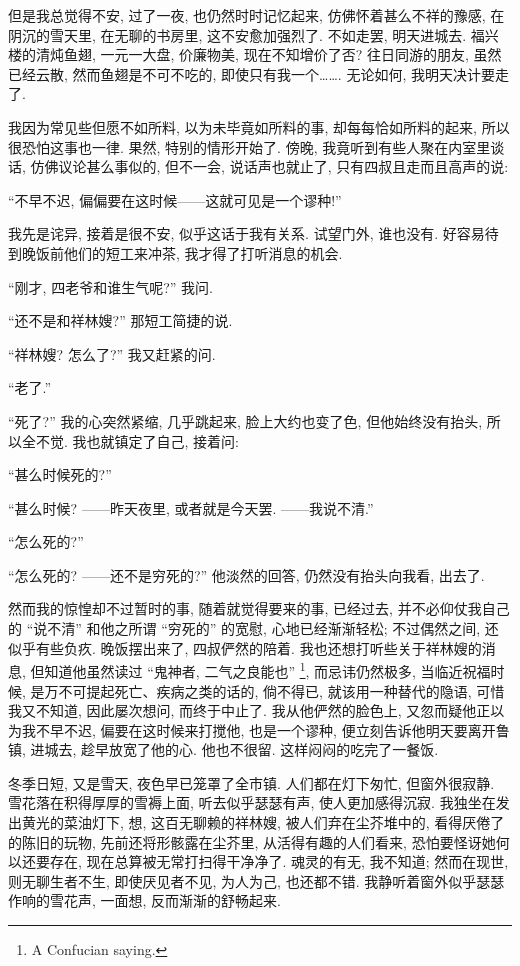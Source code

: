 但是我总觉得不安, 过了一夜, 也仍然时时记忆起来,
仿佛怀着甚么不祥的豫感, 在阴沉的雪天里, 在无聊的书房里,
这不安愈加强烈了.
不如走罢, 明天进城去.
福兴楼的清炖鱼翅, 一元一大盘, 价廉物美, 现在不知增价了否?
往日同游的朋友, 虽然已经云散,
然而鱼翅是不可不吃的, 即使只有我一个…….
无论如何, 我明天决计要走了.

我因为常见些但愿不如所料, 以为未毕竟如所料的事,
却每每恰如所料的起来, 所以很恐怕这事也一律.
果然, 特别的情形开始了.
傍晚, 我竟听到有些人聚在内室里谈话, 仿佛议论甚么事似的, 但不一会, 说话声也就止了, 只有四叔且走而且高声的说:

``不早不迟, 偏偏要在这时候——这就可见是一个谬种!''

我先是诧异, 接着是很不安, 似乎这话于我有关系.
试望门外, 谁也没有.
好容易待到晚饭前他们的短工来冲茶, 我才得了打听消息的机会.

``刚才, 四老爷和谁生气呢?''
我问.

``还不是和祥林嫂?''
那短工简捷的说.

``祥林嫂? 怎么了?''
我又赶紧的问.

``老了.''

``死了?''
我的心突然紧缩, 几乎跳起来, 脸上大约也变了色,
但他始终没有抬头, 所以全不觉.
我也就镇定了自己, 接着问:

``甚么时候死的?''

``甚么时候? ——昨天夜里, 或者就是今天罢.
——我说不清.''

``怎么死的?''

``怎么死的? ——还不是穷死的?''
他淡然的回答, 仍然没有抬头向我看, 出去了.

然而我的惊惶却不过暂时的事, 随着就觉得要来的事, 已经过去,
并不必仰仗我自己的 ``说不清'' 和他之所谓 ``穷死的'' 的宽慰,
心地已经渐渐轻松;
不过偶然之间, 还似乎有些负疚.
晚饭摆出来了, 四叔俨然的陪着.
我也还想打听些关于祥林嫂的消息,
但知道他虽然读过 ``鬼神者, 二气之良能也''%
\footnote{A Confucian saying.},
而忌讳仍然极多, 当临近祝福时候,
是万不可提起死亡、疾病之类的话的,
倘不得已, 就该用一种替代的隐语,
可惜我又不知道, 因此屡次想问, 而终于中止了.
我从他俨然的脸色上, 又忽而疑他正以为我不早不迟,
偏要在这时候来打搅他, 也是一个谬种, 便立刻告诉他明天要离开鲁镇, 进城去, 趁早放宽了他的心.
他也不很留.
这样闷闷的吃完了一餐饭.

冬季日短, 又是雪天, 夜色早已笼罩了全市镇.
人们都在灯下匆忙, 但窗外很寂静.
雪花落在积得厚厚的雪褥上面, 听去似乎瑟瑟有声, 使人更加感得沉寂.
我独坐在发出黄光的菜油灯下, 想,
这百无聊赖的祥林嫂, 被人们弃在尘芥堆中的,
看得厌倦了的陈旧的玩物, 先前还将形骸露在尘芥里,
从活得有趣的人们看来, 恐怕要怪讶她何以还要存在,
现在总算被无常打扫得干净净了.
魂灵的有无, 我不知道;
然而在现世, 则无聊生者不生,
即使厌见者不见, 为人为己, 也还都不错.
我静听着窗外似乎瑟瑟作响的雪花声,
一面想, 反而渐渐的舒畅起来.

